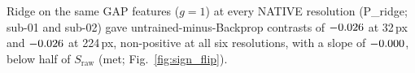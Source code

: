 Ridge on the same GAP features ($g = 1$) at every NATIVE resolution (P\_ridge; sub-01 and
sub-02) gave untrained-minus-Backprop contrasts of $-0.026$ at 32\,px and
$-0.026$ at 224\,px, non-positive at all six resolutions, with a slope of
$-0.000$, below half of $S_{\mathrm{raw}}$ (met; Fig.~\ref{fig:sign_flip}).
